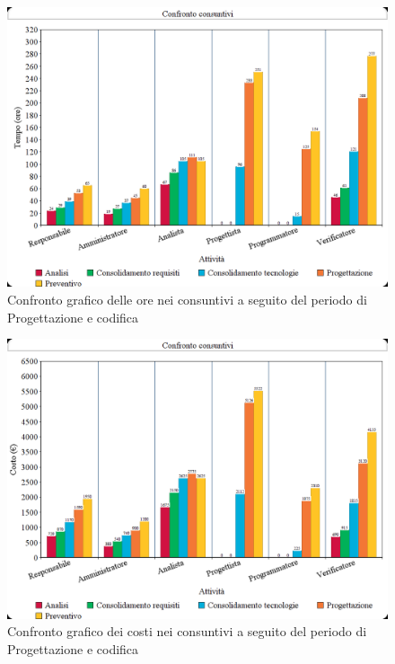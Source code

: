 \documentclass[./PianodiProgetto.tex]{subfiles}
\begin{document}
\begin{figure}[H]
	\centering
	\includegraphics[width=1\linewidth]{img/grafici/OreConsuntivo/consuntivo-ore-progettazione}
	\caption{Confronto grafico delle ore nei consuntivi a seguito del periodo di Progettazione e codifica}
	\label{fig:consuntivo-ore-progettazione}
\end{figure}

\begin{figure}[H]
	\centering
	\includegraphics[width=1\linewidth]{img/grafici/CostiConsuntivi/consuntivo-costo-progettazione}
	\caption{Confronto grafico dei costi nei consuntivi a seguito del periodo di Progettazione e codifica}
	\label{fig:consuntivo-costi-progettazione}
\end{figure}
\end{document}
